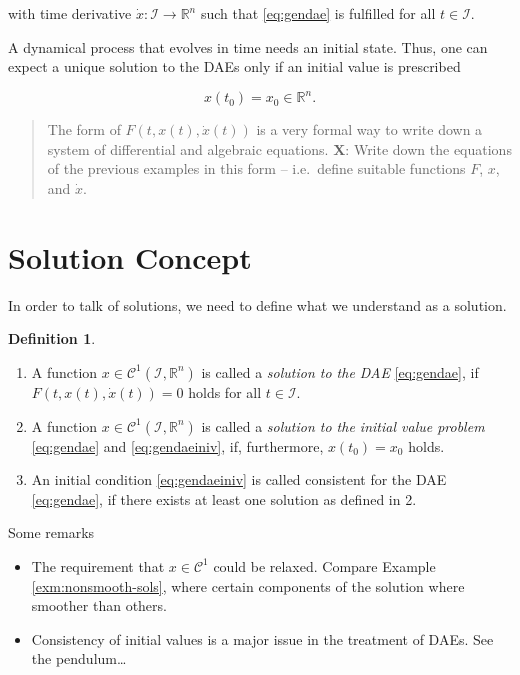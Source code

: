 \documentclass[]{book}
\providecommand{\tightlist}{%
  \setlength{\itemsep}{0pt}\setlength{\parskip}{0pt}}
\newenvironment {JHSAYS} [0] {\begin{quote}\color{jhsc}} {\end{quote}}
\theoremstyle{definition}
\newtheorem{definition}{Definition}[chapter]
\theoremstyle{definition}
\theoremstyle{definition}
\theoremstyle{definition}
\theoremstyle{remark}
\begin{document}
with time derivative \(\dot x \colon \mathcal I \to \mathbb R^{n}\) such that \eqref{eq:gendae} is fulfilled for all \(t\in \mathcal I\).

A dynamical process that evolves in time needs an initial state. Thus, one can expect a unique solution to the DAEs only if an initial value is prescribed

\begin{equation}
    x(t_0) = x_0 \in \mathbb R^{n}. \label{eq:gendaeiniv} 
\end{equation}

\begin{JHSAYS}
The form of \(F(t, x(t), \dot x(t))\) is a very formal way to write down
a system of differential and algebraic equations. \textbf{X}: Write down
the equations of the previous examples in this form -- i.e.~define
suitable functions \(F\), \(x\), and \(\dot x\).
\end{JHSAYS}

\hypertarget{solution-concept}{%
\section{Solution Concept}\label{solution-concept}}

In order to talk of solutions, we need to define what we understand as a solution.

\begin{definition}
\protect\hypertarget{def:dae-solution}{}{\label{def:dae-solution} }\(\quad\)

\begin{enumerate}
\def\labelenumi{\arabic{enumi}.}
\item
  A function \(x \in \mathcal C^1(\mathcal I, \mathbb R^{n})\) is called a \emph{solution to the DAE} \eqref{eq:gendae}, if \(F(t, x(t), \dot x(t)) = 0\) holds for all \(t\in \mathcal I\).
\item
  A function \(x \in \mathcal C^1(\mathcal I, \mathbb R^{n})\) is called a \emph{solution to the initial value problem} \eqref{eq:gendae} and \eqref{eq:gendaeiniv}, if, furthermore, \(x(t_0)= x_0\) holds.
\item
  An initial condition \eqref{eq:gendaeiniv} is called consistent for the DAE \eqref{eq:gendae}, if there exists at least one solution as defined in 2.
\end{enumerate}
\end{definition}

Some remarks

\begin{itemize}
\tightlist
\item
  The requirement that \(x \in \mathcal C^1\) could be relaxed. Compare Example \ref{exm:nonsmooth-sols}, where certain components of the solution where smoother than others.
\item
  Consistency of initial values is a major issue in the treatment of DAEs. See the pendulum\ldots{}
\end{itemize}
\end{document}
